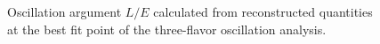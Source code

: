 %     
%     

\begin{figure}
    \centering
    
    \caption{Oscillation argument $L/E$ calculated from reconstructed quantities at the best fit point of the three-flavor oscillation analysis.}
    \label{fig:data_mc_post_fit_l_over_e}
\end{figure}
